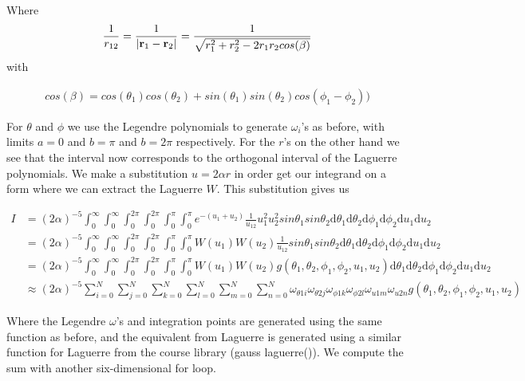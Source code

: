 \documentclass[norsk,a4paper,11pt]{article}
\begin{document}
Where
\begin{align}
     \frac{1}{r_{12}} = \frac{1}{|{\bf r}_1-{\bf r}_2|} = \frac{1}{\sqrt{r_1^2+r_2^2-2r_1r_2cos(\beta)}}
\end{align}
with

\begin{align}
    cos(\beta) = cos(\theta_1)cos(\theta_2)+sin(\theta_1)sin(\theta_2)cos(\phi_1-\phi_2))
\end{align}

For $\theta$ and $\phi$ we use the Legendre polynomials to generate $\omega_i$'s as before, with limits $a=0$ and $b=\pi$
and $b=2\pi$ respectively.
For the $r$'s on the other hand we see that the interval now corresponds to the orthogonal interval of the Laguerre
polynomials. We make a substitution $u = 2\alpha r$ in order get our integrand on a form where we can extract the Laguerre $W$.
This substitution gives us

\begin{align*}
     I &= (2\alpha)^{-5}\int_{0}^{\infty} \int_{0}^{\infty} \int_{0}^{2\pi} \int_{0}^{2\pi} \int_{0}^{\pi} \int_{0}^{\pi}
      e^{-(u_1+u_2)}\frac{1}{u_{12}} u_1^2 u_2^2 sin\theta_1 sin\theta_2
     \mathrm{d}\theta_1 \mathrm{d}\theta_2 \mathrm{d}\phi_1 \mathrm{d}\phi_2 \mathrm{d}u_1 \mathrm{d}u_2 \\
      & = (2\alpha)^{-5}\int_{0}^{\infty} \int_{0}^{\infty} \int_{0}^{2\pi} \int_{0}^{2\pi} \int_{0}^{\pi} \int_{0}^{\pi}
      W(u_1)W(u_2)\frac{1}{u_{12}} sin\theta_1 sin\theta_2
     \mathrm{d}\theta_1 \mathrm{d}\theta_2 \mathrm{d}\phi_1 \mathrm{d}\phi_2 \mathrm{d}u_1 \mathrm{d}u_2 \\
      & = (2\alpha)^{-5}\int_{0}^{\infty} \int_{0}^{\infty} \int_{0}^{2\pi} \int_{0}^{2\pi} \int_{0}^{\pi} \int_{0}^{\pi}
      W(u_1)W(u_2)g(\theta_1, \theta_2, \phi_1, \phi_2, u_1, u_2)
     \mathrm{d}\theta_1 \mathrm{d}\theta_2 \mathrm{d}\phi_1 \mathrm{d}\phi_2 \mathrm{d}u_1 \mathrm{d}u_2 \\
     & \approx
     (2\alpha)^{-5} \sum_{i=0}^{N} \sum_{j=0}^{N} \sum_{k=0}^{N}
      \sum_{l=0}^{N} \sum_{m=0}^{N} \sum_{n=0}^{N}
      \omega_{\theta1i}\omega_{\theta2j} 
      \omega_{\phi1k}\omega_{\phi2l} \omega_{u1m}\omega_{u2n}
      g(\theta_1, \theta_2, \phi_1, \phi_2, u_1, u_2)
\end{align*}

Where the Legendre $\omega$'s and integration points are generated using the same function as before, and the equivalent from Laguerre
is generated using a similar function for Laguerre from the course library (gauss laguerre()). We compute the sum with another
six-dimensional for loop.
\end{document}

